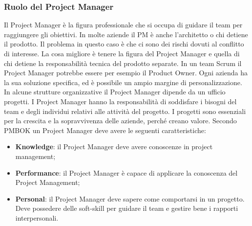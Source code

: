\subsubsection{Ruolo del Project Manager}
Il Project Manager è la figura professionale che si occupa di guidare il team per raggiungere gli obiettivi. In molte aziende il PM è anche l'architetto o chi detiene il prodotto. Il problema in questo caso è che ci sono dei rischi dovuti al conflitto di interesse. La cosa migliore è tenere la figura del Project Manager e quella di chi detiene la responsabilità tecnica del prodotto separate.\newline
In un team Scrum il Project Manager potrebbe essere per esempio il Product Owner. Ogni azienda ha la sua soluzione specifica, ed è possibile un ampio margine di personalizzazione. In alcune strutture organizzative il Project Manager dipende da un ufficio progetti. I Project Manager hanno la responsabilità di soddisfare i bisogni del team e degli individui relativi alle attività del progetto.\newline
I progetti sono essenziali per la crescita e la sopravvivenza delle aziende, perché creano valore. Secondo PMBOK un Project Manager deve avere le seguenti caratteristiche:
\begin{itemize}
	\item \textbf{Knowledge}: il Project Manager deve avere conoscenze in project management;
	\item \textbf{Performance}: il Project Manager è capace di applicare la conoscenza del Project Management;
	\item \textbf{Personal}: il Project Manager deve sapere come comportarsi in un progetto. Deve possedere delle soft-skill per guidare il team e gestire bene i rapporti interpersonali.
\end{itemize}
